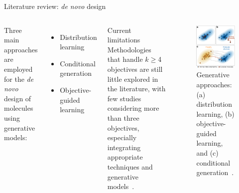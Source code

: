\documentclass[aspectratio=169,xcolor=dvipsnames]{beamer}
\begin{document}
\begin{frame}{Literature review: \textit{de novo} design}
    \begin{columns}[c]
        Three main approaches are employed for the \textit{de novo} design of molecules using generative models:
        \begin{itemize}
            \item Distribution learning
            \item Conditional generation
            \item Objective-guided learning
        \end{itemize}
        \begin{block}{Current limitations}
            Methodologies that handle $k\geq$4 objectives are still little
            explored in the literature, with few studies considering
            more than three objectives, especially integrating appropriate techniques and generative models~\cite{angelo2023multi}.
        \end{block}

        \begin{figure}
            \centering
            \includegraphics[width=.75\linewidth]{imgs/generation-approaches.png}
            \caption{Generative approaches: (a) distribution learning, (b) objective-guided learning, and (c) conditional generation~\cite{özçelik2025generative}.}
        \end{figure}
    \end{columns}
\end{frame}
\end{document}
